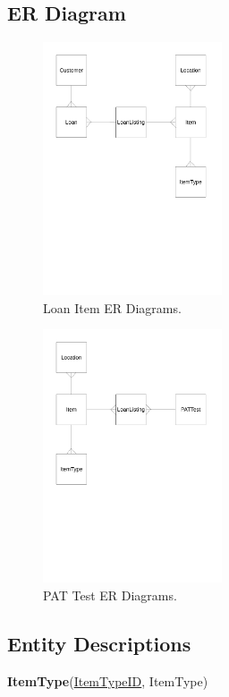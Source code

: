 \subsection{ER Diagram}

\begin{figure}[H]
    \centerline{\includegraphics[width=200px]{./Analysis/ER_Diagrams/Loan_ER_Diagrams.pdf}}
    \caption{Loan Item ER Diagrams.} \label{fig:ER Diagrams}
\end{figure}

\begin{figure}[H]
    \centerline{\includegraphics[width=200px]{./Analysis/ER_Diagrams/PAT_Test_ER_Diagrams.pdf}}
    \caption{PAT Test ER Diagrams.} \label{fig:ER Diagrams}
\end{figure}

\subsection{Entity Descriptions}

\noindent \textbf{ItemType}(\underline{ItemTypeID}, ItemType)\\

